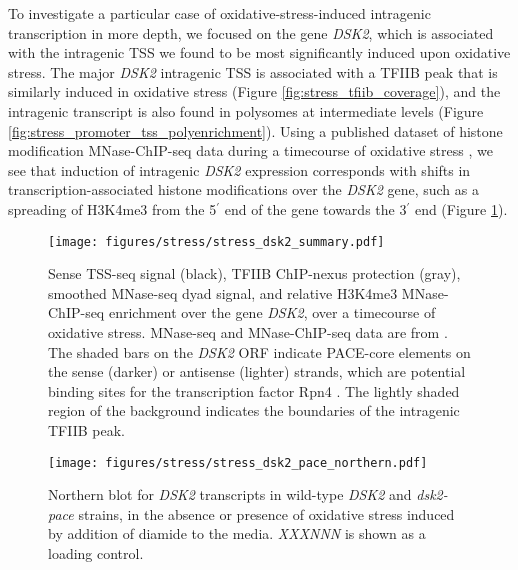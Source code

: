 To investigate a particular case of oxidative-stress-induced intragenic transcription in more depth, we focused on the gene \textit{DSK2}, which is associated with the intragenic TSS we found to be most significantly induced upon oxidative stress.
The major \textit{DSK2} intragenic TSS is associated with a TFIIB peak that is similarly induced in oxidative stress (Figure \ref{fig:stress_tfiib_coverage}), and the intragenic transcript is also found in polysomes at intermediate levels (Figure \ref{fig:stress_promoter_tss_polyenrichment}).
Using a published dataset of histone modification MNase-ChIP-seq data during a timecourse of oxidative stress \citep{weiner2015}, we see that induction of intragenic \textit{DSK2} expression corresponds with shifts in transcription-associated histone modifications over the \textit{DSK2} gene, such as a spreading of H3K4me3 from the 5$^\prime$ end of the gene towards the 3$^\prime$ end (Figure \ref{fig:stress_dsk2_summary}).
\begin{figure}[h]
    \texttt{[image: figures/stress/stress\_dsk2\_summary.pdf]}
    \caption[Sense TSS-seq signal, TFIIB ChIP-nexus protection, and MNase-ChIP-seq data at the \textit{DSK2} gene, over an oxidative stress timecourse.]{Sense TSS-seq signal (black), TFIIB ChIP-nexus protection (gray), smoothed MNase-seq dyad signal, and relative H3K4me3 MNase-ChIP-seq enrichment over the gene \textit{DSK2}, over a timecourse of oxidative stress. MNase-seq and MNase-ChIP-seq data are from \citet{weiner2015}. The shaded bars on the \textit{DSK2} ORF indicate PACE-core elements on the sense (darker) or antisense (lighter) strands, which are potential binding sites for the transcription factor Rpn4 \citep{shirozu2015}. The lightly shaded region of the background indicates the boundaries of the intragenic TFIIB peak.}
    \label{fig:stress_dsk2_summary}
\end{figure}

\begin{wrapfigure}[9]{r}{3in}
    \centering
    \texttt{[image: figures/stress/stress\_dsk2\_pace\_northern.pdf]}
    \caption[Northern blot for \textit{DSK2} transcripts in wild-type \textit{DSK2} and \textit{dsk2-pace} strains, in the absence or presence of oxidative stress.]{Northern blot for \textit{DSK2} transcripts in wild-type \textit{DSK2} and \textit{dsk2-pace} strains, in the absence or presence of oxidative stress induced by addition of diamide to the media. \textit{XXXNNN} is shown as a loading control.}
    \label{fig:stress_dsk2_pace_northern}
\end{wrapfigure}

